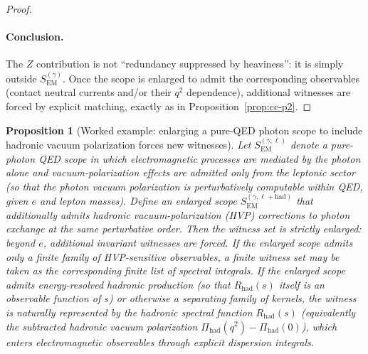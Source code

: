 \documentclass[11pt]{article}
\newtheorem{proposition}[definition]{Proposition}
\theoremstyle{remark}
\newcommand{\EM}{\ensuremath{\mathrm{EM}}}
\begin{document}
\begin{proof}
\paragraph{Conclusion.}
The $Z$ contribution is not ``redundancy suppressed by heaviness'': it is simply outside
$S_{\EM}^{(\gamma)}$. Once the scope is enlarged to admit the corresponding observables (contact neutral currents
and/or their $q^2$ dependence), additional witnesses are forced by explicit matching, exactly as in
Proposition~\ref{prop:cc-p2}.
\end{proof}

\begin{proposition}[Worked example: enlarging a pure-QED photon scope to include hadronic vacuum polarization forces new witnesses]
\label{prop:em-hvp}
Let $S_{\EM}^{(\gamma,\ell)}$ denote a \emph{pure-photon QED scope} in which electromagnetic processes are mediated by the photon alone and vacuum-polarization effects are admitted only from the \emph{leptonic} sector (so that the photon vacuum polarization is perturbatively computable within QED, given $e$ and lepton masses).
Define an enlarged scope $S_{\EM}^{(\gamma,\ell+\mathrm{had})}$ that additionally admits hadronic vacuum-polarization (HVP) corrections to photon exchange at the same perturbative order.
Then the witness set is strictly enlarged: beyond $e$, additional invariant witnesses are forced.
If the enlarged scope admits only a \emph{finite} family of HVP-sensitive observables, a finite witness set may be taken as the corresponding finite list of spectral integrals.
If the enlarged scope admits energy-resolved hadronic production (so that $R_{\mathrm{had}}(s)$ itself is an observable function of $s$) or otherwise a separating family of kernels, the witness is naturally represented by the hadronic spectral function $R_{\mathrm{had}}(s)$ (equivalently the subtracted hadronic vacuum polarization $\Pi_{\mathrm{had}}(q^2)-\Pi_{\mathrm{had}}(0)$), which enters electromagnetic observables through explicit dispersion integrals.
\end{proposition}
\end{document}
